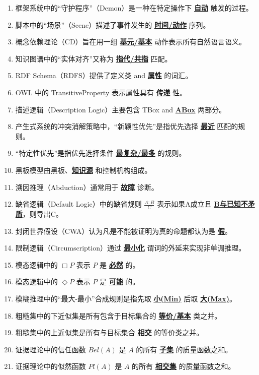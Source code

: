 \documentclass[12pt,a4paper,openany]{ctexbook}
\begin{document}
\begin{enumerate}[resume,leftmargin=2em,itemsep=1pt]
\item 框架系统中的“守护程序”（Demon）是一种在特定操作下 \underline{\textbf{自动}} 触发的过程。
\item 脚本中的“场景”（Scene）描述了事件发生的 \underline{\textbf{时间/动作}} 序列。
\item 概念依赖理论（CD）旨在用一组 \underline{\textbf{基元/基本}} 动作表示所有自然语言语义。
\item 知识图谱中的“实体对齐”又称为 \underline{\textbf{指代/共指}} 匹配。
\item RDF Schema（RDFS）提供了定义类 and \underline{\textbf{属性}} 的词汇。
\item OWL 中的 TransitiveProperty 表示属性具有 \underline{\textbf{传递}} 性。
\item 描述逻辑（Description Logic）主要包含 TBox and \underline{\textbf{ABox}} 两部分。
\item 产生式系统的冲突消解策略中，“新颖性优先”是指优先选择 \underline{\textbf{最近}} 匹配的规则。
\item “特定性优先”是指优先选择条件 \underline{\textbf{最复杂/最多}} 的规则。
\item 黑板模型由黑板、\underline{\textbf{知识源}} 和控制机构组成。
\item 溯因推理（Abduction）通常用于 \underline{\textbf{故障}} 诊断。
\item 缺省逻辑（Default Logic）中的缺省规则 $\frac{A:B}{C}$ 表示如果A成立且 \underline{\textbf{B与已知不矛盾}}，则导出C。
\item 封闭世界假设（CWA）认为凡是不能被证明为真的命题都认为是 \underline{\textbf{假}}。
\item 限制逻辑（Circumscription）通过 \underline{\textbf{最小化}} 谓词的外延来实现非单调推理。
\item 模态逻辑中的 $\Box P$ 表示 $P$ 是 \underline{\textbf{必然}} 的。
\item 模态逻辑中的 $\Diamond P$ 表示 $P$ 是 \underline{\textbf{可能}} 的。
\item 模糊推理中的“最大-最小”合成规则是指先取 \underline{\textbf{小(Min)}} 后取 \underline{\textbf{大(Max)}}。
\item 粗糙集中的下近似集是所有包含于目标集合的 \underline{\textbf{等价/基本}} 类之并。
\item 粗糙集中的上近似集是所有与目标集合 \underline{\textbf{相交}} 的等价类之并。
\item 证据理论中的信任函数 $Bel(A)$ 是 $A$ 的所有 \underline{\textbf{子集}} 的质量函数之和。
\item 证据理论中的似然函数 $Pl(A)$ 是 $A$ 的所有 \underline{\textbf{相交集}} 的质量函数之和。

\end{enumerate}
\end{document}

